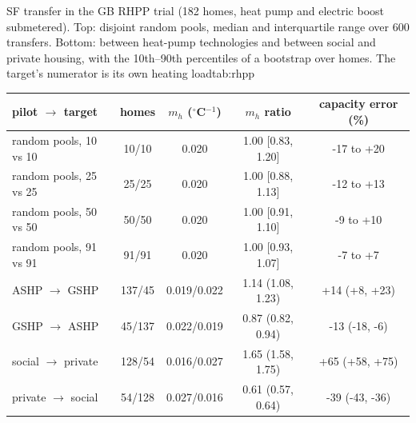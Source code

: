 \begin{autotable}{SF transfer in the GB RHPP trial (182 homes, heat pump and electric boost submetered). Top: disjoint random pools, median and interquartile range over 600 transfers. Bottom: between heat-pump technologies and between social and private housing, with the 10th--90th percentiles of a bootstrap over homes. The target's numerator is its own heating load}{tab:rhpp}
\setlength{\tabcolsep}{3pt}
\begin{tabular}{lcccc}
\toprule
pilot $\rightarrow$ target & homes & $m_h$ ($^\circ$C$^{-1}$) & $m_h$ ratio & capacity error (\%) \\
\midrule
random pools, 10 vs 10 & 10/10 & 0.020 & 1.00 [0.83, 1.20] & -17 to +20 \\
random pools, 25 vs 25 & 25/25 & 0.020 & 1.00 [0.88, 1.13] & -12 to +13 \\
random pools, 50 vs 50 & 50/50 & 0.020 & 1.00 [0.91, 1.10] & -9 to +10 \\
random pools, 91 vs 91 & 91/91 & 0.020 & 1.00 [0.93, 1.07] & -7 to +7 \\
\midrule
ASHP $\rightarrow$ GSHP & 137/45 & 0.019/0.022 & 1.14 (1.08, 1.23) & +14 (+8, +23) \\
GSHP $\rightarrow$ ASHP & 45/137 & 0.022/0.019 & 0.87 (0.82, 0.94) & -13 (-18, -6) \\
social $\rightarrow$ private & 128/54 & 0.016/0.027 & 1.65 (1.58, 1.75) & +65 (+58, +75) \\
private $\rightarrow$ social & 54/128 & 0.027/0.016 & 0.61 (0.57, 0.64) & -39 (-43, -36) \\
\bottomrule
\end{tabular}
\end{autotable}